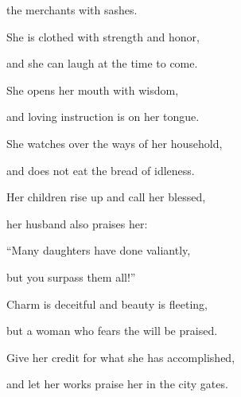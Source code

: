 {the merchants
with sashes.
\par }{\Q {}She is clothed
with strength
and honor,
\par }{\Q and she can laugh
at the time to come.
\par }{\Q {}She opens
her mouth
with wisdom,
\par }{\Q and loving
instruction
is on
her tongue.
\par }{\Q {}She watches
over the ways
of her household,
\par }{\Q and does not
eat
the bread
of idleness.
\par }{\Q {}Her children
rise up
and call her blessed,
\par }{\Q her husband
also praises her:
\par }{\Q {}“Many
daughters
have done
valiantly,
\par }{\Q but you
surpass
them all!”
\par }{\Q {}Charm
is deceitful
and beauty
is fleeting,
\par }{\Q but a woman
who fears
the
{}
will be praised.
\par }{\Q {}Give
her credit
for what she has accomplished,
\par }{\PP and let her works
praise
her in the city gates.
\par }